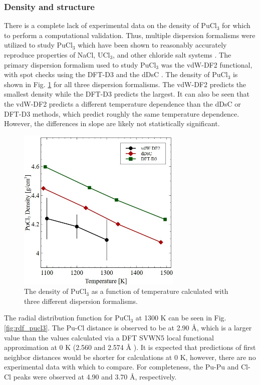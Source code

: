 \documentclass[review]{elsarticle}
\begin{document}
\subsubsection{Density and structure}
There is a complete lack of experimental data on the density of PuCl$_3$ for which to perform a computational validation. Thus, multiple dispersion formalisms were utilized to study PuCl$_3$ which have been shown to reasonably accurately reproduce properties of NaCl, UCl$_3$, and other chloride salt systems \cite{duemmler_liclkcl,duemmler_naclmgcl, ANDERSSON2022153836}. The primary dispersion formalism used to study PuCl$_3$ was the vdW-DF2 functional, with spot checks using the DFT-D3\cite{Grimme2010,grimme2011effect} and the dDsC \cite{steinmann2011comprehensive, steinmann2011generalized}. The density of PuCl$_3$ is shown in Fig. \ref{fig:pucl3_density} for all three dispersion formalisms. The vdW-DF2 predicts the smallest density while the DFT-D3 predicts the largest. It can also be seen that the vdW-DF2 predicts a different temperature dependence than the dDsC or DFT-D3 methods, which predict roughly the same temperature dependence. However, the differences in slope are likely not statistically significant. 

\begin{figure}[h!]
 \centering
 \includegraphics[width=0.7\textwidth]{PuCl-density.jpg} 
 \caption{The density of PuCl$_3$ as a function of temperature calculated with three different dispersion formalisms.}
 \label{fig:pucl3_density}
\end{figure}

The radial distribution function for PuCl$_3$ at 1300 K can be seen in Fig. \ref{fig:rdf_pucl3}. The Pu-Cl distance is observed to be at 2.90 {\AA}, which is a larger value than the values calculated via a DFT SVWN5 local functional approximation at 0 K (2.560 and 2.574 {\AA} \cite{buz2012dft}). It is expected that predictions of first neighbor distances would be shorter for calculations at 0 K, however, there are no experimental data with which to compare. For completeness, the Pu-Pu and Cl-Cl peaks were observed at 4.90 and 3.70 {\AA}, respectively. 
\end{document}
